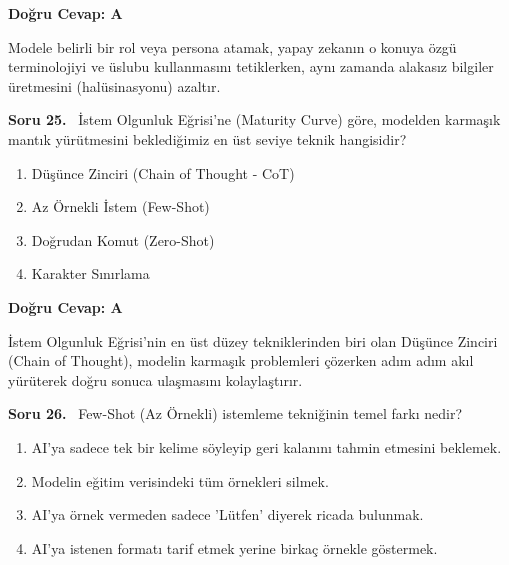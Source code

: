 \documentclass[11pt,a4paper,openany]{book}
\begin{document}
\vspace{4pt}
\begin{tcolorbox}[title=Cevap ve Açıklama, colback=gray!3!white, colframe=primarycolor!90!black, arc=2mm, fonttitle=\bfseries\sffamily, top=6pt, bottom=6pt]
    \textbf{Doğru Cevap: A}

    \vspace{2pt}
    Modele belirli bir rol veya persona atamak, yapay zekanın o konuya özgü terminolojiyi ve üslubu kullanmasını tetiklerken, aynı zamanda alakasız bilgiler üretmesini (halüsinasyonu) azaltır.
\end{tcolorbox}
\vspace{10pt}
\needspace{5cm}
\vspace{8pt}
\noindent\textbf{\large\sffamily Soru 25.} \ İstem Olgunluk Eğrisi'ne (Maturity Curve) göre, modelden karmaşık mantık yürütmesini beklediğimiz en üst seviye teknik hangisidir?

\begin{enumerate}[label=\Alph*), leftmargin=25pt, topsep=4pt, itemsep=2pt]
        \item Düşünce Zinciri (Chain of Thought - CoT)
        \item Az Örnekli İstem (Few-Shot)
        \item Doğrudan Komut (Zero-Shot)
        \item Karakter Sınırlama
\end{enumerate}

\vspace{4pt}
\begin{tcolorbox}[title=Cevap ve Açıklama, colback=gray!3!white, colframe=primarycolor!90!black, arc=2mm, fonttitle=\bfseries\sffamily, top=6pt, bottom=6pt]
    \textbf{Doğru Cevap: A}

    \vspace{2pt}
    İstem Olgunluk Eğrisi'nin en üst düzey tekniklerinden biri olan Düşünce Zinciri (Chain of Thought), modelin karmaşık problemleri çözerken adım adım akıl yürüterek doğru sonuca ulaşmasını kolaylaştırır.
\end{tcolorbox}
\vspace{10pt}
\needspace{5cm}
\vspace{8pt}
\noindent\textbf{\large\sffamily Soru 26.} \ Few-Shot (Az Örnekli) istemleme tekniğinin temel farkı nedir?

\begin{enumerate}[label=\Alph*), leftmargin=25pt, topsep=4pt, itemsep=2pt]
        \item AI'ya sadece tek bir kelime söyleyip geri kalanını tahmin etmesini beklemek.
        \item Modelin eğitim verisindeki tüm örnekleri silmek.
        \item AI'ya örnek vermeden sadece 'Lütfen' diyerek ricada bulunmak.
        \item AI'ya istenen formatı tarif etmek yerine birkaç örnekle göstermek.
\end{enumerate}
\end{document}
